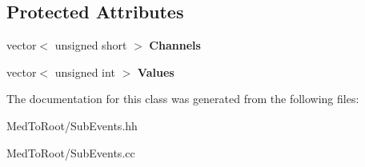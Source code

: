 \subsection*{Protected Attributes}
\begin{DoxyCompactItemize}
\item 
\hypertarget{class_scaler_sub_event_aaedde4ea0a9fb4c43afaada4863d3173}{vector$<$ unsigned short $>$ {\bfseries Channels}}\label{class_scaler_sub_event_aaedde4ea0a9fb4c43afaada4863d3173}

\item 
\hypertarget{class_scaler_sub_event_ac07cb50429e195455d77552394c2c486}{vector$<$ unsigned int $>$ {\bfseries Values}}\label{class_scaler_sub_event_ac07cb50429e195455d77552394c2c486}

\end{DoxyCompactItemize}


The documentation for this class was generated from the following files\-:\begin{DoxyCompactItemize}
\item 
Med\-To\-Root/Sub\-Events.\-hh\item 
Med\-To\-Root/Sub\-Events.\-cc\end{DoxyCompactItemize}
